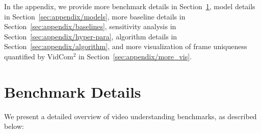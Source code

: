 \clearpage
\appendix




In the appendix, we provide more benchmark details in Section~\ref{sec:appendix/benchmarks}, model details in Section~\ref{sec:appendix/models}, more baseline details in Section~\ref{sec:appendix/baselines}, sensitivity analysis in Section~\ref{sec:appendix/hyper-para}, algorithm details in Section~\ref{sec:appendix/algorithm}, and more visualization of frame uniqueness quantified by VidCom$^2$ in Section~\ref{sec:appendix/more_vis}.


\section{Benchmark Details}
\label{sec:appendix/benchmarks}

We present a detailed overview of video understanding benchmarks, as described below:

